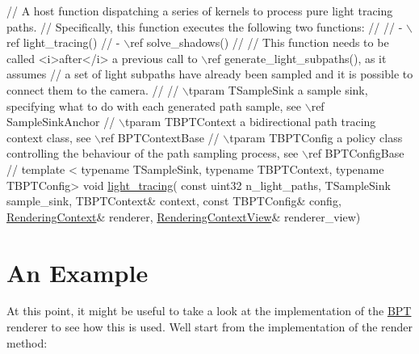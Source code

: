 \begin{DoxyCode}
\textcolor{comment}{// A host function dispatching a series of kernels to process pure light tracing paths.}
\textcolor{comment}{// Specifically, this function executes the following two functions:}
\textcolor{comment}{//}
\textcolor{comment}{// - \(\backslash\)ref light\_tracing()}
\textcolor{comment}{// - \(\backslash\)ref solve\_shadows()}
\textcolor{comment}{//}
\textcolor{comment}{// This function needs to be called <i>after</i> a previous call to \(\backslash\)ref generate\_light\_subpaths(), as it
       assumes}
\textcolor{comment}{// a set of light subpaths have already been sampled and it is possible to connect them to the camera.}
\textcolor{comment}{//}
\textcolor{comment}{// \(\backslash\)tparam TSampleSink                 a sample sink, specifying what to do with each generated path
       sample, see \(\backslash\)ref SampleSinkAnchor}
\textcolor{comment}{// \(\backslash\)tparam TBPTContext                 a bidirectional path tracing context class, see \(\backslash\)ref BPTContextBase}
\textcolor{comment}{// \(\backslash\)tparam TBPTConfig                  a policy class controlling the behaviour of the path sampling
       process, see \(\backslash\)ref BPTConfigBase}
\textcolor{comment}{//}
\textcolor{keyword}{template} <
  \textcolor{keyword}{typename} TSampleSink,
  \textcolor{keyword}{typename} TBPTContext,
  \textcolor{keyword}{typename} TBPTConfig>
\textcolor{keywordtype}{void} \hyperlink{group___b_p_t_lib_ga497e0940986e5f948a9dcf42242d39c7}{light\_tracing}(
   \textcolor{keyword}{const} uint32            n\_light\_paths,
   TSampleSink             sample\_sink,
   TBPTContext&            context,
   \textcolor{keyword}{const} TBPTConfig&       config,
   \hyperlink{struct_rendering_context}{RenderingContext}&       renderer,
   \hyperlink{struct_rendering_context_view}{RenderingContextView}&   renderer\_view)
\end{DoxyCode}
\hypertarget{_b_p_t_lib_page_BPTExampleSection}{}\section{An Example}\label{_b_p_t_lib_page_BPTExampleSection}
\begin{DoxyParagraph}{}
At this point, it might be useful to take a look at the implementation of the \hyperlink{struct_b_p_t}{B\+PT} renderer to see how this is used. We\textquotesingle{}ll start from the implementation of the render method\+:
\end{DoxyParagraph}

